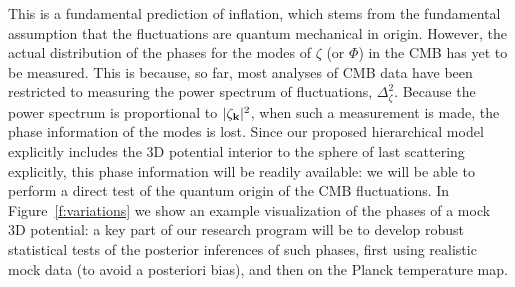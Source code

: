 \documentclass[psfig,12pt]{article}
\def\be{\begin{equation}}
\def\ee{\end{equation}}
\begin{document}
{This is a
fundamental prediction of inflation, which stems from the fundamental assumption that
the fluctuations are quantum mechanical in origin.
However, the actual distribution of the phases for the modes of $\zeta$
(or $\Phi$) in the CMB has yet to be measured. This is because, so far,
most analyses of CMB data have been restricted to measuring
the power spectrum of
fluctuations, $\Delta_\zeta^2$.
Because the power spectrum is proportional to $ |\zeta_{{\bf k}}|^2$,
when such a measurement is made, the phase information of the modes is
lost.
Since our proposed hierarchical model explicitly
includes the 3D potential interior to the sphere of last scattering
explicitly,
this phase information will
be readily available:
we will be able to perform a direct test of the quantum
origin of the CMB fluctuations. In Figure~\ref{f:variations} we
show an example visualization of the phases of a mock 3D potential:
a key part of our research program will be to develop
robust statistical
tests of the posterior inferences of such phases, first using realistic
mock data (to avoid {a posteriori} bias),
and then on the Planck temperature map.

}
\end{document}
